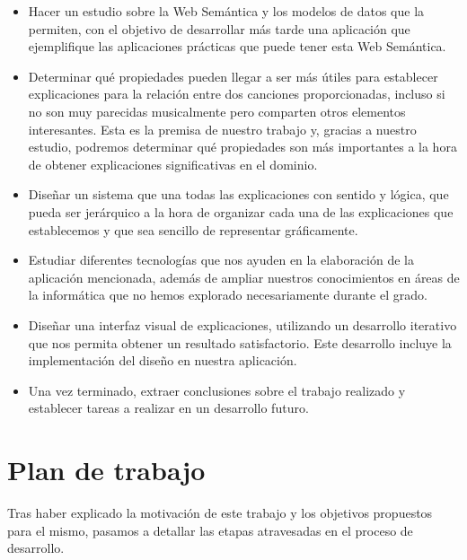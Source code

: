 \begin{itemize}
\item Hacer un estudio sobre la Web Semántica y los modelos de datos que la permiten, con el objetivo de desarrollar más tarde una aplicación que ejemplifique las aplicaciones prácticas que puede tener esta Web Semántica.\\

\item Determinar qué propiedades pueden llegar a ser más útiles para establecer explicaciones para la relación entre dos canciones proporcionadas, incluso si no son muy parecidas musicalmente pero comparten otros elementos interesantes. Esta es la premisa de nuestro trabajo y, gracias a nuestro estudio, podremos determinar qué propiedades son más importantes a la hora de obtener explicaciones significativas en el dominio.\\

\item Diseñar un sistema que una todas las explicaciones con sentido y lógica, que pueda ser jerárquico a la hora de organizar cada una de las explicaciones que establecemos y que sea sencillo de representar gráficamente.\\

\item Estudiar diferentes tecnologías que nos ayuden en la elaboración de la aplicación mencionada, además de ampliar nuestros conocimientos en áreas de la informática que no hemos explorado necesariamente durante el grado.\\

\item Diseñar una interfaz visual de explicaciones, utilizando un desarrollo iterativo que nos permita obtener un resultado satisfactorio. Este desarrollo incluye la implementación del diseño en nuestra aplicación.\\

\item Una vez terminado, extraer conclusiones sobre el trabajo realizado y establecer tareas a realizar en un desarrollo futuro.\\
\end{itemize}


\section{Plan de trabajo}

Tras haber explicado la motivación de este trabajo y los objetivos propuestos para el mismo, pasamos a detallar las etapas atravesadas en el proceso de desarrollo.\\


